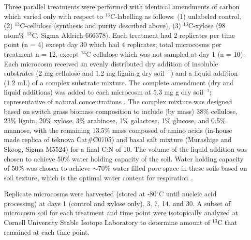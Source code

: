 \documentclass{article}
\begin{document}
Three parallel treatments were performed with identical amendments of carbon
which varied only with respect to $^{13}$C-labelling as follows: (1) unlabeled
control, (2) $^{13}$C-cellulose (synthesis and purity described above),
(3) $^{13}$C-xylose (98 atom\% $^{13}$C, Sigma Aldrich 666378). Each treatment
had 2 replicates per time point (n = 4) except day 30 which had 4 replicates;
total microcosms per treatment n = 12, except $^{13}$C-cellulose which was not
sampled at day 1 (n = 10). Each microcosm received an evenly distributed dry
addition of insoluble substrates (2 mg cellulose and 1.2 mg lignin g dry
soil$^{-1}$) and a liquid addition (1.2 mL) of a complex substrate mixture. The
complete amendment (dry and liquid additions) was added to each microcosm at
5.3 mg g dry soil$^{-1}$; representative of natural concentrations
\citep{Schneckenberger_2008}. The complex mixture was designed based on
switch grass biomass composition \citep{Yan_2010,David_2010} to include (by
mass) 38\% cellulose, 23\% lignin, 20\% xylose, 3\% arabinose, 1\% galactose,
1\% glucose, and 0.5\% mannose, with the remaining 13.5\% mass composed of
amino acids (in-house made replica of teknova Cat\#C0705) and basal salt
mixture (Murashige and Skoog, Sigma M5524) for a final C:N of 10. The volume
of the liquid addition was chosen to achieve 50\% water holding capacity of
the soil. Water holding capacity of 50\% was chosen to achieve $\sim$70\%
water filled pore space in these soils based on soil texture, which is the
optimal water content for respiration \citep{Linn_1984,Linn_1984}.

Replicate microcosms were harvested (stored at -80$^{\circ}$C until nucleic acid
processing) at days 1 (control and xylose only), 3, 7, 14, and 30. A subset of
microcosm soil for each treatment and time point were isotopically analyzed at
Cornell University Stable Isotope Laboratory to determine amount of $^{13}$C
that remained at each time point.   
\end{document}
